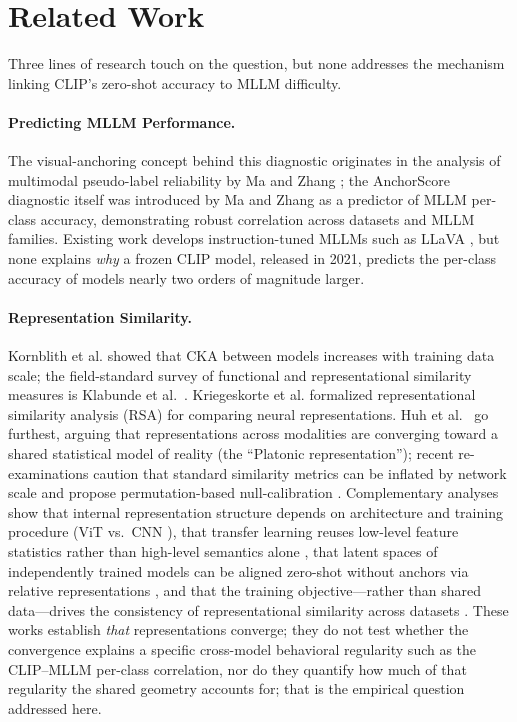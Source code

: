 \documentclass[a4paper,fleqn]{cas-sc}
\begin{document}
\section{Related Work}
\label{sec:related}

Three lines of research touch on the question, but none addresses the mechanism linking CLIP's zero-shot accuracy to MLLM difficulty.

\paragraph{Predicting MLLM Performance.}
The visual-anchoring concept behind this diagnostic originates in the analysis of multimodal pseudo-label reliability by Ma and Zhang \cite{la}; the AnchorScore diagnostic itself was introduced by Ma and Zhang \cite{ma2025anchorscore} as a predictor of MLLM per-class accuracy, demonstrating robust correlation across datasets and MLLM families. Existing work develops instruction-tuned MLLMs such as LLaVA \cite{liu2023visual}, but none explains \emph{why} a frozen CLIP model, released in 2021, predicts the per-class accuracy of models nearly two orders of magnitude larger.

\paragraph{Representation Similarity.}
Kornblith et al. \cite{kornblith2019similarity} showed that CKA between models increases with training data scale; the field-standard survey of functional and representational similarity measures is Klabunde et al.~\cite{klabunde2023similarity}. Kriegeskorte et al. \cite{kriegeskorte2008representational} formalized representational similarity analysis (RSA) for comparing neural representations. Huh et al.~\cite{huh2024platonic} go furthest, arguing that representations across modalities are converging toward a shared statistical model of reality (the ``Platonic representation''); recent re-examinations caution that standard similarity metrics can be inflated by network scale and propose permutation-based null-calibration \cite{groger2026aristotelian}. Complementary analyses show that internal representation structure depends on architecture and training procedure (ViT vs.\ CNN \cite{raghu2021vitcnn}), that transfer learning reuses low-level feature statistics rather than high-level semantics alone \cite{neyshabur2020transfer}, that latent spaces of independently trained models can be aligned zero-shot without anchors via relative representations \cite{moschella2022relative}, and that the training objective---rather than shared data---drives the consistency of representational similarity across datasets \cite{ciernik2024objective}. These works establish \emph{that} representations converge; they do not test whether the convergence explains a specific cross-model behavioral regularity such as the CLIP--MLLM per-class correlation, nor do they quantify how much of that regularity the shared geometry accounts for; that is the empirical question addressed here.
\end{document}
